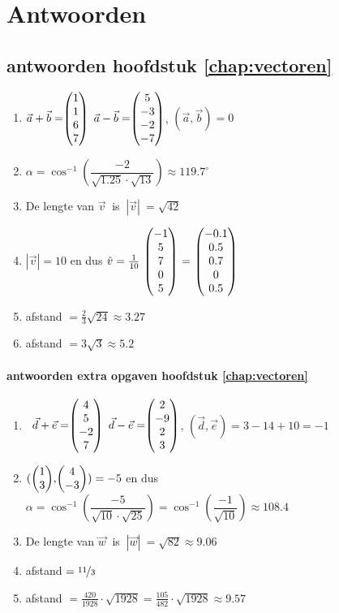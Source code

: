 \chapter{Antwoorden}

\section{antwoorden  hoofdstuk \ref{chap:vectoren}}
\begin{enumerate}
	\item   $ \vec{a} + \vec{b}  = \vecvier{1}{1}{6}{7} $   \qquad $ \vec{a} - \vec{b} = \vecvier{5}{-3}{-2}{-7} $,   \qquad $  (\vec{a} , \vec{b}) = 0 $ 
	
	
	\item  $\alpha = \cos ^{-1} \left(\dfrac{-2}{\sqrt{1.25}\cdot\sqrt{13}}\right) \approx 119.7^\circ $ 
	
	\item De lengte van  $  \vec{v} \ $ is $ \ |\vec{v}| \  =  \sqrt{42}$
	
	\item $|\vec{v}| = 10$ en dus $ \hat{v} = \frac{1}{10}\  \vecvijf{-1}{5}{7}{0}{5} \  = \  \vecvijf{-0.1}{0.5}{0.7}{0}{0.5} $
	
  \item afstand  $ = \frac{2}{3}\sqrt{24} \approx 3.27 $

	\item afstand  $ = 3\sqrt{3} \approx 5.2 $
\end{enumerate}

\subsubsection{antwoorden extra opgaven hoofdstuk \ref{chap:vectoren}}
\begin{enumerate}
	
	\item  \ $ \vec{d} + \vec{e}  = \vecvier{4}{5}{-2}{7} $   \qquad $ \vec{d} - \vec{e} = \vecvier{2}{-9}{2}{3} $,   \qquad $  (\vec{d} , \vec{e}) = 3-14+10 = -1 $ 
	
	\item $  (\vectwee{1}{3} , \vectwee{4}{-3}) = -5 $  en dus $\alpha = \cos ^{-1} \left(\dfrac{-5}{\sqrt{10}\cdot\sqrt{25}}\right)= \cos ^{-1} \left(\dfrac{-1}{\sqrt{10}}\right) \approx 108.4 $ 
	
	\item De lengte van  $  \vec{w} \ $ is $ \ |\vec{w}| \  =  \sqrt{82} \approx 9.06 $
	
	\item    afstand  $ = \nicefrac{11}{3} $

	\item afstand  $ = \frac{420}{1928}\cdot\sqrt{1928} = \frac{105}{482}\cdot\sqrt{1928} \approx 9.57 $
\end{enumerate}	

